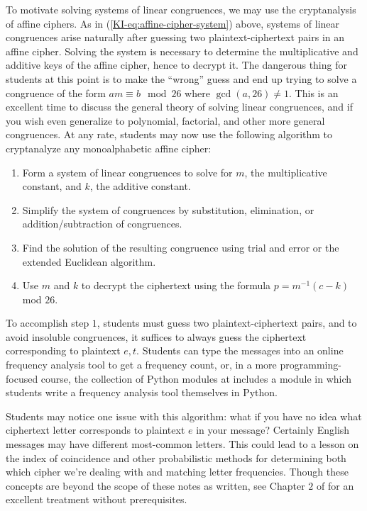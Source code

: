 \documentclass[11pt]{article}
\theoremstyle{plain}
\theoremstyle{remark}
\theoremstyle{definition}
\theoremstyle{definition}
\theoremstyle{definition}
\theoremstyle{plain}
\theoremstyle{plain}
\theoremstyle{plain}
\theoremstyle{definition}
\begin{document}
To motivate solving systems of linear congruences, we may use the
cryptanalysis of affine ciphers. As in (\ref{KI-eq:affine-cipher-system})
above, systems of linear congruences arise naturally after guessing
two plaintext-ciphertext pairs in an affine cipher. Solving the system
is necessary to determine the multiplicative and additive keys of
the affine cipher, hence to decrypt it. The dangerous thing for students
at this point is to make the ``wrong'' guess and end up trying to
solve a congruence of the form $am\equiv b\mod26$ where $\gcd(a,26)\neq1$.\textit{
}This is an excellent time to discuss the general theory of solving
linear congruences, and if you wish even generalize to polynomial,
factorial, and other more general congruences. At any rate, students
may now use the following algorithm to cryptanalyze any monoalphabetic
affine cipher:
\begin{enumerate}
\item Form a system of linear congruences to solve for $m$, the multiplicative
constant, and $k$, the additive constant.
\item Simplify the system of congruences by substitution, elimination, or
addition/subtraction of congruences.
\item Find the solution of the resulting congruence using trial and error
or the extended Euclidean algorithm. 
\item Use $m$ and $k$ to decrypt the ciphertext using the formula $p=m^{-1}(c-k)$
mod $26$.
\end{enumerate}

To accomplish step $1$, students must guess two plaintext-ciphertext
pairs, and to avoid insoluble congruences, it suffices to always guess
the ciphertext corresponding to plaintext $e,t$. Students can type
the messages into an online frequency analysis tool to get a frequency
count, or, in a more programming-focused course, the collection of
Python modules at \cite{inceResourcesFirstYearCollege2022} includes
a module in which students write a frequency analysis tool themselves
in Python.

Students may notice one issue with this algorithm: what if you have
no idea what ciphertext letter corresponds to plaintext $e$ in your
message? Certainly English messages may have different most-common
letters. This could lead to a lesson on the index of coincidence and
other probabilistic methods for determining both which cipher we're
dealing with and matching letter frequencies. Though these concepts
are beyond the scope of these notes as written, see Chapter $2$ of
\cite{mcdevittClassNotesCryptologic2012} for an excellent treatment
without prerequisites.
\end{document}

